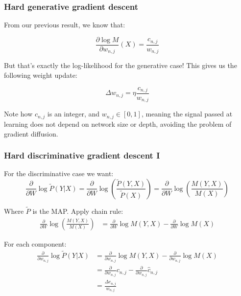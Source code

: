 \documentclass[usenames,dvipsnames]{beamer}
\newcommand{\ddspn}[2]{\frac{\partial#1}{\partial#2}}
\begin{document}
\begin{frame}
  \frametitle{Hard generative gradient descent}

  From our previous result, we know that:

  \begin{equation*}
    \ddspn{\log M}{w_{n,j}}(X)=\frac{c_{n,j}}{w_{n,j}}
  \end{equation*}

  But that's exactly the log-likelihood for the generative case! This gives us the following weight
  update:

  \begin{equation*}
    \Delta w_{n,j}=\eta\frac{c_{n,j}}{w_{n,j}}
  \end{equation*}

  Note how $c_{n,j}$ is an integer, and $w_{n,j}\in [0,1]$, meaning the signal passed at learning
  does not depend on network size or depth, avoiding the problem of gradient diffusion.
\end{frame}

\begin{frame}
  \frametitle{Hard discriminative gradient descent I}

  For the discriminative case we want:
  \begin{equation*}
    \ddspn{}{W}\log\tilde{P}(Y|X)=\ddspn{}{W}\log\left(\frac{\tilde{P}(Y,X)}{\tilde{P}(X)}\right)=
    \ddspn{}{W}\log\left(\frac{M(Y,X)}{M(X)}\right)
  \end{equation*}

  Where $\tilde{P}$ is the MAP. Apply chain rule:
  \begin{align*}
    \ddspn{}{W}\log\left(\frac{M(Y,X)}{M(X)}\right)&=\ddspn{}{W}\log M(Y,X)-\ddspn{}{W}\log M(X)
  \end{align*}

  For each component:
  \begin{align*}
    \ddspn{}{w_{n,j}}\log\tilde{P}(Y|X)&=\ddspn{}{w_{n,j}}\log M(Y,X)- \ddspn{}{w_{n,j}}\log M(X)\\
                                       &=\ddspn{}{w_{n,j}}c_{n,j}-\ddspn{}{w_{n,j}}\hat{c}_{n,j}\\
                                       &=\frac{\Delta c_{n,j}}{w_{n,j}}
  \end{align*}
\end{frame}
\end{document}
